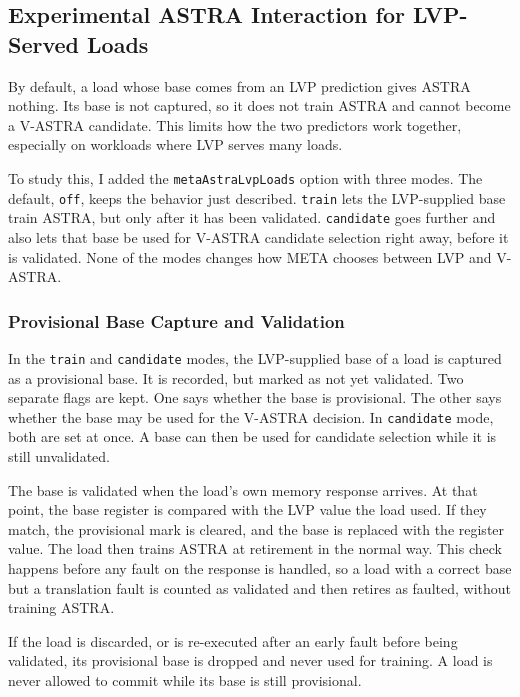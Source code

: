 \subsection{Experimental ASTRA Interaction for LVP-Served Loads}
\label{sec:impl-provisional}

By default, a load whose base comes from an LVP prediction gives ASTRA
nothing. Its base is not captured, so it does not train ASTRA and
cannot become a V-ASTRA candidate. This limits how the two predictors
work together, especially on workloads where LVP serves many loads.

To study this, I added the \texttt{metaAstraLvpLoads} option with
three modes. The default, \texttt{off}, keeps the behavior just
described. \texttt{train} lets the LVP-supplied base train ASTRA, but
only after it has been validated. \texttt{candidate} goes further and
also lets that base be used for V-ASTRA candidate selection right
away, before it is validated. None of the modes changes how META
chooses between LVP and V-ASTRA.

\subsubsection{Provisional Base Capture and Validation}
\label{sec:impl-provisional-capture}

In the \texttt{train} and \texttt{candidate} modes, the LVP-supplied
base of a load is captured as a provisional base. It is recorded, but
marked as not yet validated. Two separate flags are kept. One says
whether the base is provisional. The other says whether the base may
be used for the V-ASTRA decision. In \texttt{candidate} mode, both are
set at once. A base can then be used for candidate selection while
it is still unvalidated.

The base is validated when the load's own memory response arrives.
At that point, the base register is compared with the LVP value the
load used. If they match, the provisional mark is cleared, and the
base is replaced with the register value. The load then trains ASTRA
at retirement in the normal way. This check happens before any fault
on the response is handled, so a load with a correct base but a
translation fault is counted as validated and then retires as faulted,
without training ASTRA.

If the load is discarded, or is re-executed after an early fault
before being validated, its provisional base is dropped and never
used for training. A load is never allowed to commit while its base
is still provisional.

